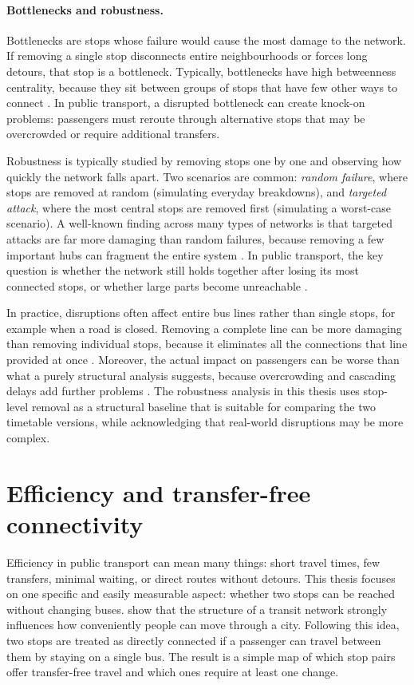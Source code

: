 \documentclass[12pt,a4paper,oneside]{report}
\begin{document}
\paragraph{Bottlenecks and robustness.}\label{sec:bottlenecks}
Bottlenecks are stops whose failure would cause the most damage to the network.
If removing a single stop disconnects entire neighbourhoods or forces long detours, that stop is a bottleneck.
Typically, bottlenecks have high betweenness centrality, because they sit between groups of stops that have few other ways to connect \citep{derrible2010}.
In public transport, a disrupted bottleneck can create knock-on problems: passengers must reroute through alternative stops that may be overcrowded or require additional transfers.

Robustness is typically studied by removing stops one by one and observing how quickly the network falls apart.
Two scenarios are common: \emph{random failure}, where stops are removed at random (simulating everyday breakdowns), and \emph{targeted attack}, where the most central stops are removed first (simulating a worst-case scenario).
A well-known finding across many types of networks is that targeted attacks are far more damaging than random failures, because removing a few important hubs can fragment the entire system \citep{albert2000}.
In public transport, the key question is whether the network still holds together after losing its most connected stops, or whether large parts become unreachable \citep{derrible2010}.

In practice, disruptions often affect entire bus lines rather than single stops, for example when a road is closed.
Removing a complete line can be more damaging than removing individual stops, because it eliminates all the connections that line provided at once \citep{cicchini2024}.
Moreover, the actual impact on passengers can be worse than what a purely structural analysis suggests, because overcrowding and cascading delays add further problems \citep{hu2025}.
The robustness analysis in this thesis uses stop-level removal as a structural baseline that is suitable for comparing the two timetable versions, while acknowledging that real-world disruptions may be more complex.

\section{Efficiency and transfer-free connectivity}\label{sec:efficiency}

Efficiency in public transport can mean many things: short travel times, few transfers, minimal waiting, or direct routes without detours.
This thesis focuses on one specific and easily measurable aspect: whether two stops can be reached without changing buses.
\citet{gallotti2014} show that the structure of a transit network strongly influences how conveniently people can move through a city.
Following this idea, two stops are treated as directly connected if a passenger can travel between them by staying on a single bus.
The result is a simple map of which stop pairs offer transfer-free travel and which ones require at least one change.
\end{document}
